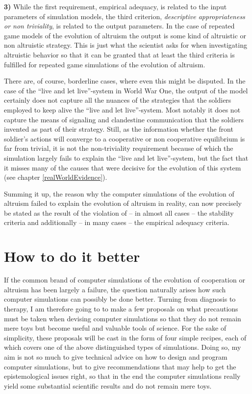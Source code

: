 {\bf 3)} While the first requirement, empirical adequacy, is related to the
input parameters of simulation models, the third criterion, {\em descriptive
  appropriateness or non triviality}, is related to the output parameters. In
the case of repeated game models of the evolution of altruism the output is
some kind of altruistic or non altruistic strategy. This is just what the
scientist asks for when investigating altruistic behavior so that it can be
granted that at least the third criteria is fulfilled for repeated game
simulations of the evolution of altruism.

There are, of course, borderline cases, where even this might be disputed. In
the case of the ``live and let live''-system in World War One, the output of
the model certainly does not capture all the nuances of the strategies that
the soldiers employed to keep alive the ``live and let live''-system. Most
notably it does not capture the means of signaling and clandestine
communication that the soldiers invented as part of their strategy. Still, as
the information whether the front soldier's actions will converge to a
cooperative or non cooperative equilibrium is far from trivial, it is not the
non-triviality requirement because of which the simulation largely fails to
explain the ``live and let live''-system, but the fact that it misses many
of the causes that were decisive for the evolution of this system (see chapter
\ref{realWorldEvidence}).

Summing it up, the reason why the computer simulations of the evolution of
altruism failed to explain the evolution of altruism in reality, can now 
precisely be stated as the result of the violation of -- in almost all cases
-- the stability criteria and additionally -- in many cases -- the empirical
adequacy criteria.

\section{How to do it better}
\label{recipes}
If the common brand of computer simulations of the evolution of cooperation or
altruism has been largely a failure, the question naturally arises how such
computer simulations can possibly be done better. Turning from diagnosis to
therapy, I am therefore going to to make a few proposals on what precautions
must be taken when devising computer simulations so that they do not remain
mere toys but become useful and valuable tools of science. For the sake of
simplicity, these proposals will be cast in the form of four simple recipes,
each of which covers one of the above distinguished types of simulations.
Doing so, my aim is not so much to give technical advice on how to design and
program computer simulations, but to give recommendations that may help to get
the epistemological issues right, so that in the end the computer simulations
really yield some substantial scientific results and do not remain mere toys.

